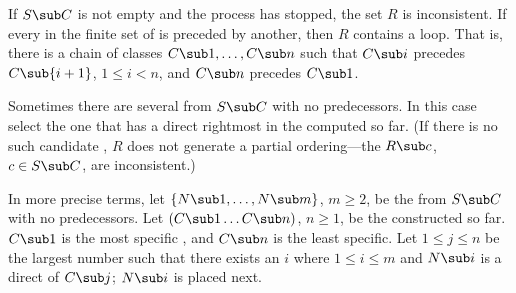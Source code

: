 If $S\sub C$ is not empty and the process has stopped, the set $R$ is
inconsistent. If every  in the finite set of 
 is preceded
by another, then $R$ contains a loop. That is, there is a chain of
classes $C\sub 1,\ldots,C\sub n$ such that $C\sub i$ precedes
$C\sub{i+1}$, $1\leq i<n$, and $C\sub n$ precedes $C\sub 1$.

Sometimes there are several  from $S\sub C$ with no
predecessors.  In this case select the one that has a direct
 rightmost in the  computed so far.
(If there is no such candidate , $R$ does not generate 
a partial ordering---the $R\sub c$, $c\in S\sub C$, are inconsistent.)

In more precise terms, let $\{N\sub 1,\ldots,N\sub m\}$, $m\geq 2$, be
the  from $S\sub C$ with no predecessors.  Let $(C\sub
1\ldots C\sub n)$, $n\geq 1$, be the 
constructed so far.  $C\sub 1$ is the most specific , and $C\sub
n$ is the least specific.  Let $1\leq j\leq n$ be the largest number
such that there exists an $i$ where $1\leq i\leq m$ and $N\sub i$
is a direct  of $C\sub j$; $N\sub i$ is placed next.

%

